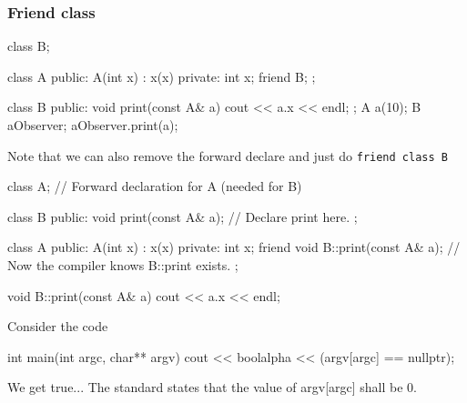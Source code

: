 \documentclass{report}
\begin{document}
\bigbreak \noindent 
\subsubsection{Friend class}
\bigbreak \noindent 
\begin{cppcode}
    class B;

    class A {
        public:
        A(int x) : x(x) {}
        private:
        int x{};
        friend B;
    };

    class B {
        public: 
        void print(const A& a) {
            cout << a.x << endl;
        }
    };
    A a(10);
    B aObserver{};
    aObserver.print(a);
\end{cppcode}
\bigbreak \noindent 
Note that we can also remove the forward declare and just do \texttt{friend class B}
\bigbreak \noindent 
\begin{cppcode}
    class A; // Forward declaration for A (needed for B)

    class B {
        public:
        void print(const A& a); // Declare print here.
    };

    class A {
        public:
        A(int x) : x(x) {}
        private:
        int x{};
        friend void B::print(const A& a);  // Now the compiler knows B::print exists.
    };

    void B::print(const A& a) {
        cout << a.x << endl;
    }
\end{cppcode}

\pagebreak 
{}
\bigbreak \noindent 
Consider the code
\bigbreak \noindent 
\begin{cppcode}
    int main(int argc, char** argv) {
        cout << boolalpha << (argv[argc] == nullptr);
    }
\end{cppcode}
\bigbreak \noindent 
We get true... The standard states that the value of argv[argc] shall be 0.

\pagebreak 
{}
\bigbreak \noindent 
\end{document}
